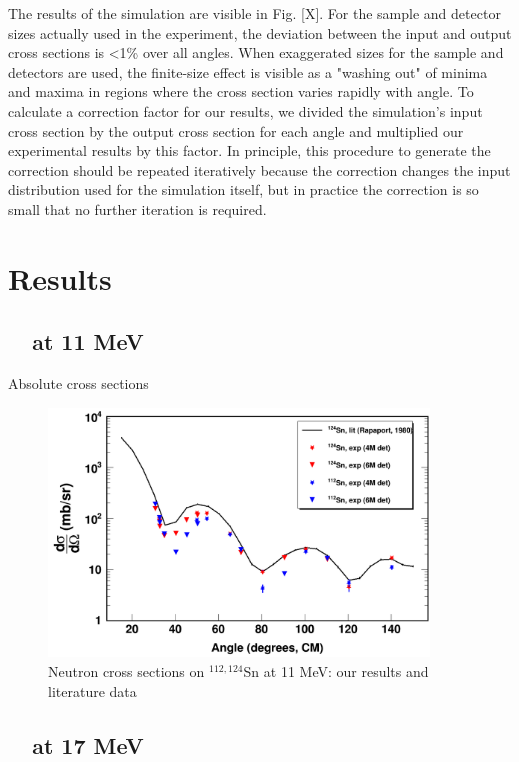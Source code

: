 The results of the simulation are visible in Fig. [X]. For the sample and
detector sizes actually used in the experiment, the deviation between the input
and output cross sections is <1\% over all angles. When exaggerated sizes for the
sample and detectors are used, the finite-size effect is visible as a "washing
out" of minima and maxima in regions where the cross section varies rapidly with
angle. To calculate a correction factor for our results, we divided the simulation's
input cross section by the output cross section for each angle and multiplied our
experimental results by this factor. In principle, this procedure to generate
the correction should be repeated iteratively because the correction changes the input distribution 
used for the simulation itself, but in practice the correction is so small
that no further iteration is required.

\section{Results}
\subsection{\snTwelveFour\ \el\ at 11 MeV}
Absolute cross sections 

\begin{figure}
    \begin{center}
        \includegraphics[width = 0.9\textwidth]{figures/neutronECS_Sn_11MeV.png}
        \caption{Neutron \el cross sections on $^{112,124}$Sn at 11
    MeV: our results and literature data}
    \label{SnECS_11MeV}
\end{center}
\end{figure}

\subsection{\snTwelveFour\ \el\ at 17 MeV}

